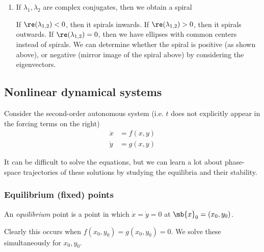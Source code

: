 \documentclass[a4paper]{article}
\begin{document}
\begin{enumerate}
\item If $\lambda_1, \lambda_2$ are complex conjugates, then we obtain a spiral

  \begin{center}
  \end{center}

  If $\re (\lambda_{1, 2}) < 0$, then it spirals inwards. If $\re (\lambda_{1, 2}) > 0$, then it spirals outwards. If $\re (\lambda_{1, 2}) = 0$, then we have ellipses with common centers instead of spirals. We can determine whether the spiral is positive (as shown above), or negative (mirror image of the spiral above) by considering the eigenvectors.
\end{enumerate}

\subsection{Nonlinear dynamical systems}
Consider the second-order autonomous system (i.e. $t$ does not explicitly appear in the forcing terms on the right)
\begin{align*}
  \dot x &= f(x, y)\\
  \dot y &= g(x, y)
\end{align*}

It can be difficult to solve the equations, but we can learn a lot about phase-space trajectories of these solutions by studying the equilibria and their stability.

\subsubsection{Equilibrium (fixed) points}
\begin{defi}
  An \emph{equilibrium} point is a point in which $\dot x = \dot y = 0$ at $\mb{x}_0 = (x_0, y_0)$.
\end{defi}

Clearly this occurs when $f(x_0, y_0) = g(x_0, y_0) = 0$. We solve these simultaneously for $x_0, y_0$.
\end{document}

